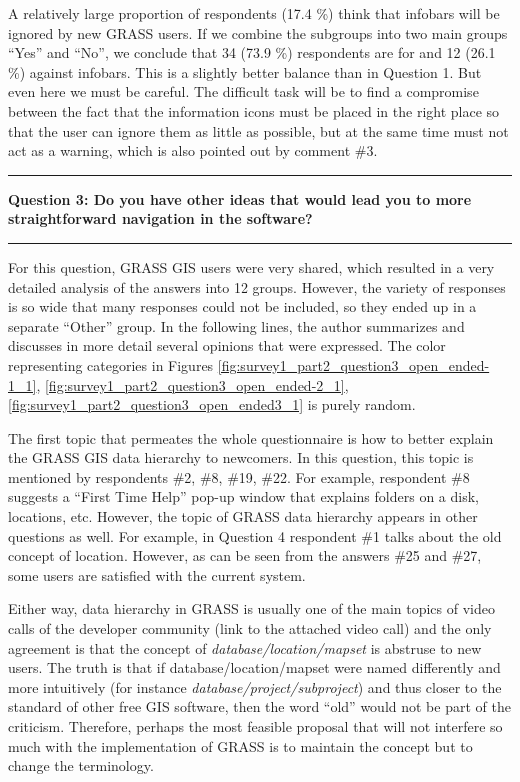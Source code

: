 \documentclass[a4paper,10pt,twoside]{article}
\begin{document}
\noindent A relatively large proportion of respondents (17.4 \%) think
that infobars will be ignored by new GRASS users. If we combine the
subgroups into two main groups ``Yes'' and ``No'', we conclude that 34
(73.9 \%) respondents are for and 12 (26.1 \%) against infobars. This
is a slightly better balance than in Question 1. But even here we must
be careful. The difficult task will be to find a compromise between
the fact that the information icons must be placed in the right place
so that the user can ignore them as little as possible, but at the
same time must not act as a warning, which is also pointed out by
comment \#3.

\par\noindent\rule{\textwidth}{0.4pt}
\noindent \textbf{Question 3: Do you have other ideas that would lead you to more straightforward navigation in the software?}
\par\noindent\rule{\textwidth}{0.4pt}
\noindent For this question, GRASS GIS users were very shared, which
resulted in a very detailed analysis of the answers into 12
groups. However, the variety of responses is so wide that many
responses could not be included, so they ended up in a separate
``Other'' group. In the following lines, the author summarizes and
discusses in more detail several opinions that were expressed. The
color representing categories in Figures
\ref{fig:survey1_part2_question3_open_ended-1_1},
\ref{fig:survey1_part2_question3_open_ended-2_1},
\ref{fig:survey1_part2_question3_open_ended3_1} is purely random.

The first topic that permeates the whole questionnaire is how to
better explain the GRASS GIS data hierarchy to newcomers. In this
question, this topic is mentioned by respondents \#2, \#8, \#19,
\#22. For example, respondent \#8 suggests a ``First Time Help''
pop-up window that explains folders on a disk, locations,
etc. However, the topic of GRASS data hierarchy appears in other
questions as well. For example, in Question 4 respondent \#1 talks
about the old concept of location. However, as can be seen from the
answers \#25 and \#27, some users are satisfied with the current
system.

Either way, data hierarchy in GRASS is usually one of the main topics
of video calls of the developer community (link to the attached video
call) and the only agreement is that the concept of
\textit{database/location/mapset} is abstruse to new users. The truth
is that if database/location/mapset were named differently and more
intuitively (for instance \textit{database/project/subproject}) and
thus closer to the standard of other free GIS software, then the
word ``old'' would not be part of the criticism. Therefore, perhaps
the most feasible proposal that will not interfere so much with the
implementation of GRASS is to maintain the concept but to change the
terminology.
\end{document}
